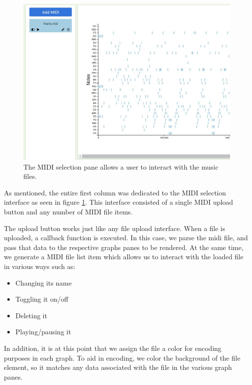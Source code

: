 \documentclass[journal]{vgtc}                %
\begin{document}
\begin{figure}[h]
  \centering
  \includegraphics[width=\columnwidth]{midi-selection-single-track}
  \caption{The MIDI selection pane allows a user to interact with the music files.}
  \label{fig:midi-selection}
\end{figure}

As mentioned, the entire first column was dedicated to the MIDI selection
interface as seen in figure \ref{fig:midi-selection}. This interface consisted
of a single MIDI upload button and any number of MIDI file items.

The upload button works just like any file upload interface. When a file is
uploaded, a callback function is executed. In this case, we parse the midi file,
and pass that data to the respective graphs panes to be rendered. At the same
time, we generate a MIDI file list item which allows us to interact with the
loaded file in various ways such as:

\begin{itemize}
  \item Changing its name
  \item Toggling it on/off
  \item Deleting it
  \item Playing/pausing it
\end{itemize}

In addition, it is at this point that we assign the file a color for encoding
purposes in each graph. To aid in encoding, we color the background of the
file element, so it matches any data associated with the file in the various
graph panes.
\end{document}
